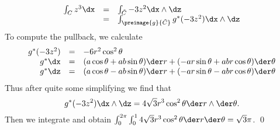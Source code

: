 \documentclass[letterpaper]{article}
\begin{document}
\begin{enumerate}
	\[\begin{array}{rcl}
		\int_C z^3\dx&=&\int_{\tilde{C}}-3z^2\dx\wedge\dz\\
		&=&\int_{\preimage{g}{\tilde{C}}}g^*(-3z^2)\dx\wedge\dz\\
	\end{array}\]
	To compute the pullback, we calculate
		\[\begin{array}{rcl}
			g^*(-3z^2)&=&-6r^2\cos^2\theta\\
			g^*{\dx}&=&(a\cos\theta+ab\sin\theta)\der r+(-ar\sin\theta+abr\cos\theta)\der\theta\\
			g^*{\dz}&=&(a\cos\theta-ab\sin\theta)\der r+(-ar\sin\theta-abr\cos\theta)\der\theta\\
		\end{array}	\]
		Thus after quite some simplifying we find that 
		$$g^*(-3z^2)\dx\wedge\dz=4\sqrt{3}r^3\cos^2\theta\der r \wedge\der\theta.$$
		Then we integrate and obtain $\int_0^{2\pi}\int_0^1 4\sqrt{3}r^3\cos^2\theta\der r\der\theta=\sqrt3\pi$. \qed
	

\end{enumerate}
\end{document}
